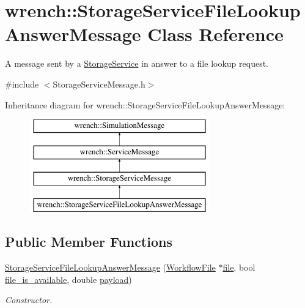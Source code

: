 \hypertarget{classwrench_1_1_storage_service_file_lookup_answer_message}{}\section{wrench\+:\+:Storage\+Service\+File\+Lookup\+Answer\+Message Class Reference}
\label{classwrench_1_1_storage_service_file_lookup_answer_message}


A message sent by a \hyperlink{classwrench_1_1_storage_service}{Storage\+Service} in answer to a file lookup request.  




{\ttfamily \#include $<$Storage\+Service\+Message.\+h$>$}

Inheritance diagram for wrench\+:\+:Storage\+Service\+File\+Lookup\+Answer\+Message\+:\begin{figure}[H]
\begin{center}
\leavevmode
\includegraphics[height=4.000000cm]{classwrench_1_1_storage_service_file_lookup_answer_message}
\end{center}
\end{figure}
\subsection*{Public Member Functions}
\begin{DoxyCompactItemize}
\item 
\hyperlink{classwrench_1_1_storage_service_file_lookup_answer_message_aaff2303ab4bc3b2859a948a55a43ea1f}{Storage\+Service\+File\+Lookup\+Answer\+Message} (\hyperlink{classwrench_1_1_workflow_file}{Workflow\+File} $\ast$\hyperlink{classwrench_1_1_storage_service_file_lookup_answer_message_aecfa1c0fd28d996275e93ad80becbeb8}{file}, bool \hyperlink{classwrench_1_1_storage_service_file_lookup_answer_message_a707266a9904d1cea4b548a290c0ca432}{file\+\_\+is\+\_\+available}, double \hyperlink{classwrench_1_1_simulation_message_a914f2732713f7c02898e66f05a7cb8a1}{payload})
\begin{DoxyCompactList}\small\item\em Constructor. \end{DoxyCompactList}\end{DoxyCompactItemize}
